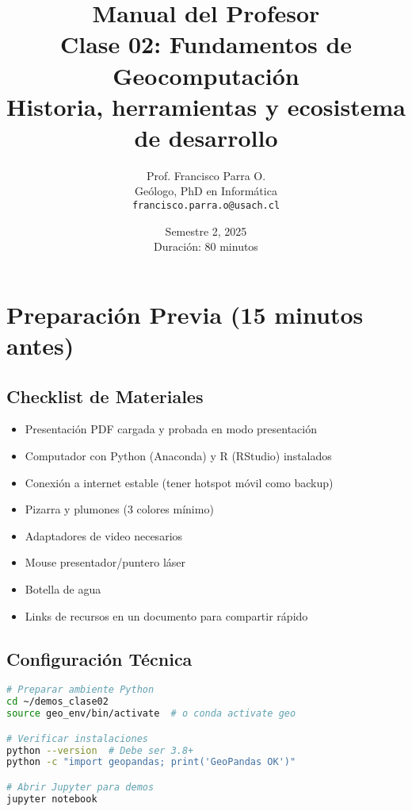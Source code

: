 \documentclass[11pt,a4paper]{article}
\title{{\Huge \textbf{Manual del Profesor}}\\[0.5cm]
{\Large Clase 02: Fundamentos de Geocomputación}\\[0.3cm]
{\large Historia, herramientas y ecosistema de desarrollo}}
\author{Prof. Francisco Parra O.\\
Geólogo, PhD en Informática\\
\texttt{francisco.parra.o@usach.cl}}
\date{Semestre 2, 2025\\
Duración: 80 minutos}
\begin{document}
\maketitle
\thispagestyle{empty}
\newpage

\tableofcontents
\newpage

\section{Preparación Previa (15 minutos antes)}

\subsection{Checklist de Materiales}

\begin{mdframed}[backgroundcolor=gray!10]
\begin{itemize}[label=$\square$]
    \item Presentación PDF cargada y probada en modo presentación
    \item Computador con Python (Anaconda) y R (RStudio) instalados
    \item Conexión a internet estable (tener hotspot móvil como backup)
    \item Pizarra y plumones (3 colores mínimo)
    \item Adaptadores de video necesarios
    \item Mouse presentador/puntero láser
    \item Botella de agua
    \item Links de recursos en un documento para compartir rápido
\end{itemize}
\end{mdframed}

\subsection{Configuración Técnica}

\begin{lstlisting}[language=bash, title=Terminal 1: Ambiente Python]
# Preparar ambiente Python
cd ~/demos_clase02
source geo_env/bin/activate  # o conda activate geo

# Verificar instalaciones
python --version  # Debe ser 3.8+
python -c "import geopandas; print('GeoPandas OK')"

# Abrir Jupyter para demos
jupyter notebook
\end{lstlisting}
\end{document}
